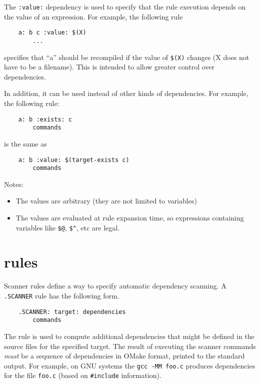 The \verb+:value:+ dependency is used to specify that the rule execution depends on the value of an
expression.  For example, the following rule

\begin{verbatim}
    a: b c :value: $(X)
        ...
\end{verbatim}

specifies that ``a'' should be recompiled if the value of \verb+$(X)+ changes
(X does not have to be a filename).  This is intended to allow greater
control over dependencies.

In addition, it can be used instead of other kinds of dependencies. For example,
the following rule:

\begin{verbatim}
    a: b :exists: c
        commands
\end{verbatim}

is the same as

\begin{verbatim}
    a: b :value: $(target-exists c)
        commands
\end{verbatim}

Notes:
\begin{itemize}
\item The values are arbitrary (they are not limited to variables)
\item The values are evaluated at rule expansion time, so expressions
containing variables like \verb+$@+, \verb+$^+, etc are legal.
\end{itemize}

\section{ rules}

Scanner rules define a way to specify automatic dependency scanning.  A \verb+.SCANNER+ rule has the
following form.

\begin{verbatim}
    .SCANNER: target: dependencies
        commands
\end{verbatim}

The rule is used to compute additional dependencies that might be defined in the source files for
the specified target. The result of executing the scanner commands \emph{must} be a sequence of
dependencies in OMake format, printed to the standard output.  For example, on GNU systems the
\verb+gcc -MM foo.c+ produces dependencies for the file \verb+foo.c+ (based on \verb+#include+
information).

